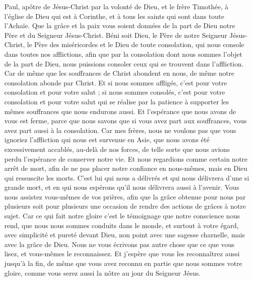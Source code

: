 \begin{multicols}{2}
\TextTitle{[Introduction]}
\VerseOne{}Paul, apôtre de Jésus-Christ par la volonté de Dieu, et le frère Timothée, à l'église de Dieu qui est à Corinthe, et à tous les saints qui sont dans toute l'Achaïe.
Que la grâce et la paix vous soient données de la part de Dieu notre Père et du Seigneur Jésus-Christ.
Béni soit Dieu, le Père de notre Seigneur Jésus-Christ, le Père des miséricordes et le Dieu de toute consolation,
qui nous console dans toutes nos afflictions, afin que par la consolation dont nous sommes l’objet de la part de Dieu, nous puissions consoler ceux qui se trouvent dans l’affliction.
Car de même que les souffrances de Christ abondent en nous, de même notre consolation abonde par Christ.
Et si nous sommes affligés, c'est pour votre consolation et pour votre salut ; si nous sommes consolés, c'est pour votre consolation et pour votre salut qui se réalise par la patience à supporter les mêmes souffrances que nous endurons aussi.
Et l'espérance que nous avons de vous est ferme, parce que nous savons que si vous avez part aux souffrances, vous avez part aussi à la consolation.
Car mes frères, nous ne voulons pas que vous ignoriez l’affliction qui nous est survenue en Asie, que nous avons été excessivement accablés, au-delà de nos forces, de telle sorte que nous avions perdu l'espérance de conserver notre vie.
Et nous regardions comme certain notre arrêt de mort, afin de ne pas placer notre confiance en nous-mêmes, mais en Dieu qui ressuscite les morts.
C’est lui qui nous a délivrés et qui nous délivrera d'une si grande mort, et en qui nous espérons qu'il nous délivrera aussi à l'avenir.
Vous nous assistez vous-mêmes de vos prières, afin que la grâce obtenue pour nous par plusieurs soit pour plusieurs une occasion de rendre des actions de grâces à notre sujet.
Car ce qui fait notre gloire c’est le témoignage que notre conscience nous rend, que nous nous sommes conduits dans le monde, et surtout à votre égard, avec simplicité et pureté devant Dieu, non point avec une sagesse charnelle, mais avec la grâce de Dieu.
Nous ne vous écrivons pas autre chose que ce que vous lisez, et vous-mêmes le reconnaissez. Et j'espère que vous les reconnaîtrez aussi jusqu'à la fin,
de même que vous avez reconnu en partie que nous sommes votre gloire, comme vous serez aussi la nôtre au jour du Seigneur Jésus.

\end{multicols}
